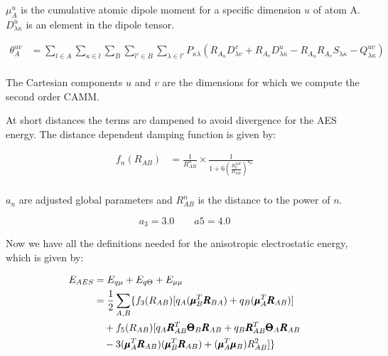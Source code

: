 $\mu_A^u$ is the cumulative atomic dipole moment for a specific dimension $u$ of atom A. $D_{\lambda \kappa}^u$ is an element in the dipole tensor.

\begin{equation}
\begin{split}
        \theta_A^{uv} &= \sum_{l \in A} \sum_{\kappa \in l} \sum_{B} \sum_{l' \in B} \sum_{\lambda \in l'} P_{\kappa \lambda} (R_{A_u} D_{\lambda v}^v + R_{A_v} D_{\lambda \kappa}^u - R_{A_u} R_{A_v} S_{\lambda \kappa} - Q_{\lambda \kappa}^{uv})\\
\end{split}
\end{equation}

The Cartesian components $u$ and $v$ are the dimensions for which we compute the second order CAMM.


At short distances the terms are dampened to avoid divergence for the AES energy. The distance dependent damping function is given by:

\begin{equation}
\begin{split}
        f_n(R_{AB}) &=  \frac{1}{R_{AB}^n} \times \frac{1}{1 + 6 \left(\frac{R_0^{AB}}{R_{AB}}\right)^{a_n}}\\
\end{split}
\end{equation}

$a_n$ are adjusted global parameters and $R_{AB}^n$ is the distance to the power of $n$. 

\[
  a_3 = 3.0 \quad\quad a5 = 4.0
\]

Now we have all the definitions needed for the anisotropic electrostatic energy, which is given by:

\begin{equation}
\begin{split}
    \E{AES} &= \E{q\mu}+\E{q\Theta} + \E{\mu\mu}\\
    &= \frac{1}{2}\sum_{A,B}\{f_3(R_{AB})[q_A(\pmb{\mu}_B^T\pmb{R}_{BA})+q_B(\pmb{\mu}_A^T\pmb{R}_{AB})]\\
    &\quad + f_5(R_{AB})[q_A\pmb{R}_{AB}^T\pmb{\Theta}_B\pmb{R}_{AB}+q_B\pmb{R}_{AB}^T\pmb{\Theta}_A\pmb{R}_{AB}\\
    &\quad -3(\pmb{\mu}_A^T\pmb{R}_{AB})(\pmb{\mu}_B^T\pmb{R}_{AB}) + (\pmb{\mu}_A^T\pmb{\mu}_B)R_{AB}^2] \}\\
\end{split}
\end{equation}


